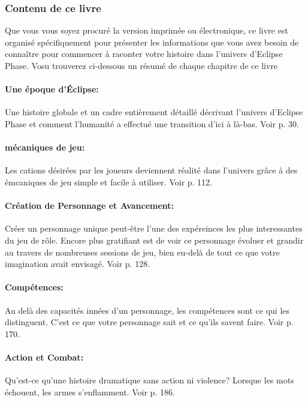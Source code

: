 \subsubsection{Contenu de ce livre} \label{sec:contents-this-book} 

Que vous vous soyez procuré la version imprimée ou électronique, ce livre est organisé spécifiquement pour présenter les informations que vous avez besoin de connaître pour commencer à raconter votre histoire dans l'univers d'Eclipse Phase. Vosu trouverez ci-dessous un résumé de chaque chapitre de ce livre 

\paragraph{Une époque d'Éclipse:} Une histoire globale et un cadre entièrement détaillé décrivant l'univers d'Eclipse Phase et comment l'humanité a effectué une transition d'ici à là-bas. Voir p. 30. 

\paragraph{mécaniques de jeu:} Les cations désirées par les joueurs deviennent réalité dans l'univers grâce à des émcaniques de jeu simple et facile à utiliser. Voir p. 112. 

\paragraph{Création de Personnage et Avancement:} Créer un personnage unique peut-être l'une des expéreinces les plus interessantes du jeu de rôle. Encore plus gratifiant est de voir ce personnage évoluer et grandir au travers de nombreuses sessions de jeu, bien eu-delà de tout ce que votre imagination avait envisagé. Voir p. 128. 

\paragraph{Compétences:} Au delà des capacités innées d'un personnage, les compétences sont ce qui les distinguent. C'est ce que votre personnage sait et ce qu'ils savent faire. Voir p. 170. 

\paragraph{Action et Combat:} Qu'est-ce qu'une histoire dramatique sans action ni violence? Lorsque les mots échouent, les armes s'enflamment. Voir p. 186. 

